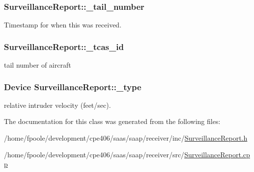 \subsubsection[{\+\_\+tail\+\_\+number}]{ Surveillance\+Report\+::\+\_\+tail\+\_\+number\hspace{0.3cm}{\ttfamily [protected]}}\label{class_surveillance_report_a87dcfc53aefdb626b6d6968ee7d0fc88}
Timestamp for when this was received. \hypertarget{class_surveillance_report_ab53661ea6069e7946b7092d962e8f5b7}{}
\subsubsection[{\+\_\+tcas\+\_\+id}]{ Surveillance\+Report\+::\+\_\+tcas\+\_\+id\hspace{0.3cm}{\ttfamily [protected]}}\label{class_surveillance_report_ab53661ea6069e7946b7092d962e8f5b7}
tail number of aircraft \hypertarget{class_surveillance_report_a5da1e71fef162b45aec2319056a896cb}{}
\subsubsection[{\+\_\+type}]{\setlength{\rightskip}{0pt plus 5cm}Device Surveillance\+Report\+::\+\_\+type\hspace{0.3cm}{\ttfamily [protected]}}\label{class_surveillance_report_a5da1e71fef162b45aec2319056a896cb}
relative intruder velocity (feet/sec). 

The documentation for this class was generated from the following files\+:\begin{DoxyCompactItemize}
\item 
/home/fpoole/development/cpe406/saas/saap/receiver/inc/\hyperlink{_surveillance_report_8h}{Surveillance\+Report.\+h}\item 
/home/fpoole/development/cpe406/saas/saap/receiver/src/\hyperlink{_surveillance_report_8cpp}{Surveillance\+Report.\+cpp}\end{DoxyCompactItemize}
